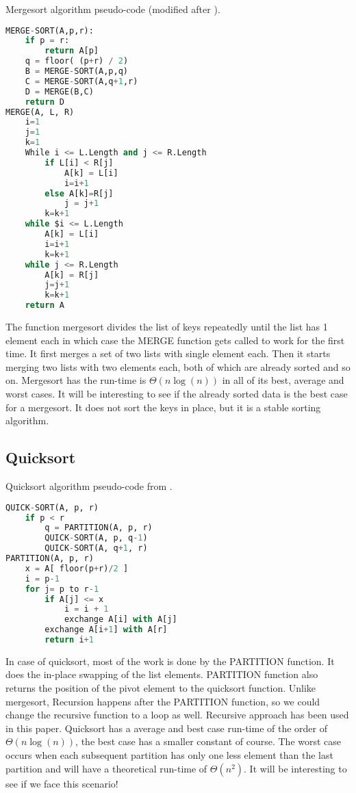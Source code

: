 \documentclass[sigconf, nonacm, natbib, screen, balance=False]{acmart}
\begin{document}
\begin{listing}
  \caption{Mergesort algorithm pseudo-code (modified after \citet[Ch.~2.3]{CLRS_2009}).}
  \label{lst:merge_algo}
\begin{lstlisting}[language=Python]
MERGE-SORT(A,p,r):    
    if p = r:
        return A[p]
    q = floor( (p+r) / 2) 
    B = MERGE-SORT(A,p,q)
    C = MERGE-SORT(A,q+1,r)
    D = MERGE(B,C)
    return D
MERGE(A, L, R)
    i=1
    j=1
    k=1
    While i <= L.Length and j <= R.Length
        if L[i] < R[j]
            A[k] = L[i]
            i=i+1
        else A[k]=R[j]
            j = j+1
        k=k+1
    while $i <= L.Length
        A[k] = L[i]
        i=i+1
        k=k+1
    while j <= R.Length
        A[k] = R[j]
        j=j+1
        k=k+1 
    return A
\end{lstlisting}
\end{listing}
The function mergesort divides the list of keys repeatedly until the list has 1 element each in which case the MERGE function gets called to work for the first time. It first merges a set of two lists with single element each. Then it starts merging two lists with two elements each, both of which are already sorted and so on. \newline
Mergesort has the run-time is $\Theta \left(n\log\left(n\right)\right)$ in all of its best, average and worst cases. It will be interesting to see if the already sorted data is the best case for a mergesort. It does not sort the keys in place, but it is a stable sorting algorithm.
\subsection{Quicksort}\label{sec:quicksort}

\begin{listing}
  \caption{Quicksort algorithm pseudo-code from \citet[Ch.~7.1]{CLRS_2009}.}
  \label{lst:quick_algo}
\begin{lstlisting}[language=Python]
QUICK-SORT(A, p, r)
    if p < r
        q = PARTITION(A, p, r)
        QUICK-SORT(A, p, q-1)
        QUICK-SORT(A, q+1, r)
PARTITION(A, p, r)
	x = A[ floor(p+r)/2 ]
	i = p-1
	for j= p to r-1
		if A[j] <= x
			i = i + 1
			exchange A[i] with A[j]
		exchange A[i+1] with A[r]
		return i+1
\end{lstlisting}
\end{listing}

In case of quicksort, most of the work is done by the PARTITION function. It does the in-place swapping of the list elements. PARTITION function also returns the position of the pivot element to the quicksort function. Unlike mergesort, Recursion happens after the PARTITION function, so we could change the recursive function to a loop as well. Recursive approach has been used in this paper.\newline
Quicksort has a average and best case run-time of the order of $\Theta \left(n\log\left(n\right)\right)$, the best case has a smaller constant of course. The worst case occurs when each subsequent partition has only one less element than the last partition and will have a theoretical run-time of $\Theta \left(n^2\right)$. It will be interesting to see if we face this scenario!
\end{document}
